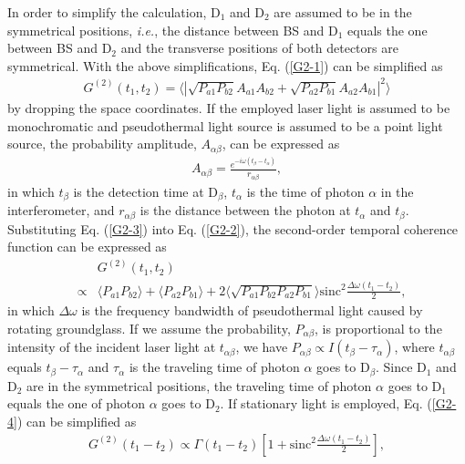 \documentclass[12pt]{iopart}
\begin{document}
In order to simplify the calculation, D$_1$ and D$_2$ are assumed to be in the symmetrical positions, \textit{i.e.}, the distance between BS and D$_1$ equals the one between BS and D$_2$ and the transverse positions of both detectors are symmetrical. With the above simplifications, Eq. (\ref{G2-1}) can be simplified as
\begin{eqnarray}\label{G2-2}
G^{(2)}(t_1,t_2)=\langle |\sqrt{P_{a1}P_{b2}}A_{a1}A_{b2}+\sqrt{P_{a2}P_{b1}}A_{a2}A_{b1} |^2 \rangle
\end{eqnarray}
by dropping the space coordinates. If the employed laser light is assumed to be monochromatic and pseudothermal light source is assumed to be a point light source, the probability amplitude, $A_{\alpha\beta}$, can be expressed as \cite{QFT}
\begin{eqnarray}\label{G2-3}
A_{\alpha\beta}=\frac{e^{-i{\omega (t_\beta-t_\alpha)}}}{r_{\alpha\beta}},
\end{eqnarray}
in which $t_{\beta}$ is the detection time at D$_\beta$, $t_\alpha$ is the time of photon $\alpha$ in the interferometer, and $r_{\alpha\beta}$ is the distance between the photon at $t_{\alpha}$ and $t_{\beta}$. Substituting Eq. (\ref{G2-3}) into Eq. (\ref{G2-2}), the second-order temporal coherence function can be expressed as \cite{zhou,liu-6,shih-book}
\begin{eqnarray}\label{G2-4}
&&G^{(2)}(t_1,t_2)\nonumber\\
&\propto& \langle P_{a1}P_{b2} \rangle + \langle P_{a2}P_{b1}\rangle+2\langle \sqrt{P_{a1}P_{b2}P_{a2}P_{b1}} \rangle \text{sinc}^2\frac{\Delta \omega (t_1-t_2)}{2},
\end{eqnarray}
in which $\Delta \omega$ is the frequency bandwidth of pseudothermal light caused by rotating groundglass. If we assume the probability, $P_{\alpha\beta}$, is proportional to the intensity of the incident laser light at $t_{\alpha\beta}$, we have $P_{\alpha\beta} \propto I(t_\beta-\tau_\alpha)$, where $t_{\alpha\beta}$ equals $t_\beta-\tau_\alpha$ and $\tau_\alpha$ is the traveling time of photon $\alpha$ goes to D$_\beta$. Since D$_1$ and D$_2$ are in the symmetrical positions, the traveling time of photon $\alpha$ goes to D$_1$ equals the one of photon $\alpha$ goes to D$_2$. If stationary light is employed, Eq. (\ref{G2-4}) can be simplified as \cite{mandel-book}
\begin{eqnarray}\label{G2-5}
G^{(2)}(t_1-t_2)\propto \Gamma(t_1-t_2) [1+ \text{sinc}^2\frac{\Delta \omega (t_1-t_2)}{2}],
\end{eqnarray}
\end{document}
